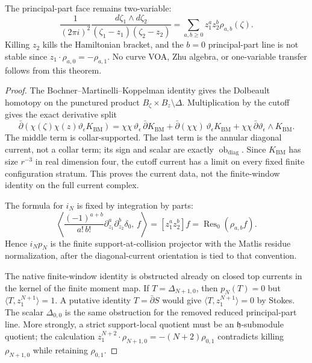 \begin{thm}
  The principal-part face remains two-variable:
  \[
    \frac{1}{(2\pi i)^2}
    \frac{d\zeta_1\wedge d\zeta_2}
         {(\zeta_1-z_1)(\zeta_2-z_2)}
    =
    \sum_{a,b\geq0}z_1^az_2^b\rho_{a,b}(\zeta).
  \]
  Killing \(z_2\) kills the Hamiltonian bracket, and the \(b=0\)
  principal-part line is not stable since
  \(z_1\cdot\rho_{a,0}=-\rho_{a,1}\).  No curve VOA, Zhu algebra, or
  one-variable transfer follows from this theorem.
\end{thm}

\begin{proof}
  The Bochner--Martinelli--Koppelman identity gives the Dolbeault
  homotopy on the punctured product \(B_\zeta\times B_z\setminus\Delta\).
  Multiplication by the cutoff gives the exact derivative split
  \[
    \bar\partial(\chi(\zeta)\chi(z)
      \vartheta_\epsilon K_{\mathrm{BM}})
    =
    \chi\chi\,\vartheta_\epsilon\,\bar\partial K_{\mathrm{BM}}
    +\bar\partial(\chi\chi)\,\vartheta_\epsilon K_{\mathrm{BM}}
    +\chi\chi\,\bar\partial\vartheta_\epsilon\wedge K_{\mathrm{BM}} .
  \]
  The middle term is collar-supported.  The last term is the annular
  diagonal current, not a collar term; its sign and scalar are exactly
  \(\operatorname{ob}_{\mathrm{diag}}\).  Since \(K_{\mathrm{BM}}\) has
  size \(r^{-3}\) in real dimension four, the cutoff current has a limit
  on every fixed finite configuration stratum.  This proves the current
  data, not the finite-window identity on the full current complex.

  The formula for \(i_N\) is fixed by integration by parts:
  \[
    \left\langle
      \frac{(-1)^{a+b}}{a!\,b!}
      \partial_{z_1}^a\partial_{z_2}^b\delta_0,\,
      f
    \right\rangle
    =
    [z_1^az_2^b]f
    =
    \operatorname{Res}_0(\rho_{a,b}f).
  \]
  Hence \(i_Np_N\) is the finite support-at-collision projector with the
  Matlis residue normalization, after the diagonal-current orientation is
  tied to that convention.

  The native finite-window identity is obstructed already on closed top
  currents in the kernel of the finite moment map.  If
  \(T=\Delta_{N+1,0}\), then \(p_N(T)=0\) but
  \(\langle T,z_1^{N+1}\rangle=1\).  A putative identity
  \(T=\bar\partial S\) would give
  \(\langle T,z_1^{N+1}\rangle=0\) by Stokes.  The scalar
  \(\Delta_{0,0}\) is the same obstruction for the removed reduced
  principal-part line.  More strongly, a strict support-local quotient
  must be an \(\mathfrak h\)-submodule quotient; the calculation
  \(z_1^{N+2}\cdot\rho_{N+1,0}=-(N+2)\rho_{0,1}\) contradicts killing
  \(\rho_{N+1,0}\) while retaining \(\rho_{0,1}\).


\end{proof}
